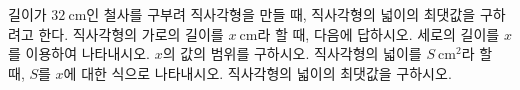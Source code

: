 길이가 $32\ \mathrm{cm}$인 철사를 구부려 직사각형을 만들 때, 직사각형의 넓이의 최댓값을 구하려고 한다. 직사각형의 가로의 길이를 $x\ \mathrm{cm}$라 할 때, 다음에 답하시오. 
 세로의 길이를 $x$를 이용하여 나타내시오.
 $x$의 값의 범위를 구하시오.
 직사각형의 넓이를 $S\ \mathrm{cm}^2$라 할 때, $S$를 $x$에 대한 식으로 나타내시오.
 직사각형의 넓이의 최댓값을 구하시오.
